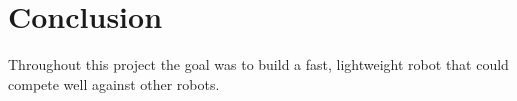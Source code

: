 \section{Conclusion}

Throughout this project the goal was to build a fast, lightweight robot that could compete well against other robots.